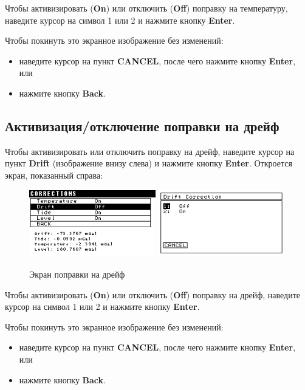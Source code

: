 Чтобы активизировать (\textbf{On}) или отключить (\textbf{Off}) поправку на температуру, наведите
курсор на символ 1 или 2 и нажмите кнопку \textbf{Enter}.

Чтобы покинуть это экранное изображение без изменений:
\begin{itemize}
  \item наведите курсор на пункт \textbf{CANCEL}, после чего нажмите кнопку
    \textbf{Enter}, или

  \item нажмите кнопку \textbf{Back}.
\end{itemize}

\subsection{Активизация/отключение поправки на дрейф}

Чтобы активизировать или отключить поправку на дрейф, наведите курсор на пункт
\textbf{Drift} (изображение внизу слева) и нажмите кнопку \textbf{Enter}.
Откроется экран, показанный справа:

\begin{figure}[H]
  \centering
  \includegraphics[width=0.49\textwidth]{figures/the_drift_correction_screen_1}
  \includegraphics[width=0.49\textwidth]{figures/the_drift_correction_screen_2}
  \caption{Экран поправки на дрейф}
  \label{fig:the_drift_correction_screen}
\end{figure}

Чтобы активизировать (\textbf{On}) или отключить (\textbf{Off}) поправку на
дрейф, наведите курсор на символ 1 или 2 и нажмите кнопку \textbf{Enter}.

Чтобы покинуть это экранное изображение без изменений:
\begin{itemize}
  \item наведите курсор на пункт \textbf{CANCEL}, после чего нажмите кнопку
    \textbf{Enter}, или

  \item нажмите кнопку \textbf{Back}.
\end{itemize}

